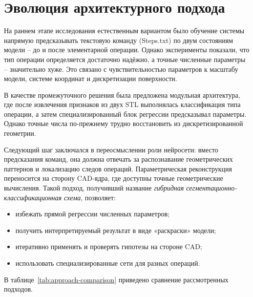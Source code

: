 \section{Эволюция архитектурного подхода}

На раннем этапе исследования естественным вариантом было обучение системы напрямую предсказывать текстовую команду (Steps.txt) по двум состояниям модели – до и после элементарной операции. Однако эксперименты показали, что тип операции определяется достаточно надёжно, а точные численные параметры – значительно хуже. Это связано с чувствительностью параметров к масштабу модели, системе координат и дискретизации поверхности.

В качестве промежуточного решения была предложена модульная архитектура, где после извлечения признаков из двух STL выполнялась классификация типа операции, а затем специализированный блок регрессии предсказывал параметры. Однако точные числа по-прежнему трудно восстановить из дискретизированной геометрии.

Следующий шаг заключался в переосмыслении роли нейросети: вместо предсказания команд, она должна отвечать за распознавание геометрических паттернов и локализацию следов операций. Параметрическая реконструкция переносится на сторону CAD-ядра, где доступны точные геометрические вычисления. Такой подход, получивший название \textit{гибридная сегментационно-классификационная схема}, позволяет:
\begin{itemize}
    \item избежать прямой регрессии численных параметров;
    \item получить интерпретируемый результат в виде «раскраски» модели;
    \item итеративно применять и проверять гипотезы на стороне CAD;
    \item использовать специализированные сети для разных операций.
\end{itemize}

В таблице~\ref{tab:approach-comparison} приведено сравнение рассмотренных подходов.

